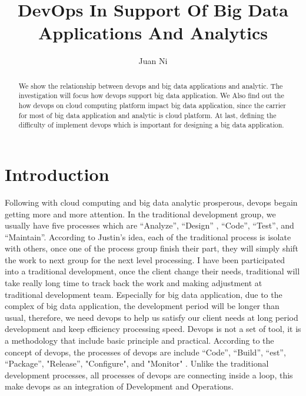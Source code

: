 \documentclass[sigconf]{acmart}
\begin{document}
\title{DevOps In Support Of Big Data Applications And Analytics}


\author{Juan Ni}




\begin{abstract}
We show the relationship between devops and big data applications and analytic. The investigation will focus how devops support big data application. We Also find out the how devops on cloud computing platform impact big data application, since the carrier for  most of big data application and analytic is cloud platform. At last, defining the difficulty of implement devops which is important for designing a big data application.
\end{abstract}



\maketitle

\section{Introduction}

Following with cloud computing and big data analytic prosperous, devops begain getting more and more attention. In the traditional development group, we usually have five processes which are ``Analyze'', ``Design'' , ``Code'', ``Test'', and ``Maintain''\cite{traditional:01}. According to Justin's idea, each of the traditional process is isolate with others, once one of the process group finish their part, they will simply shift the work to next group for the next level processing. I have been participated into a traditional development, once the client change their needs, traditional will take really long time to track back the work and making adjustment at traditional development team. Especially for big data application, due to the complex of big data application, the development period will be longer than usual, therefore, we need devops to help us satisfy our client needs at long period development and keep efficiency processing speed. Devops is not a set of tool, it is a methodology that include basic principle and practical. According to the concept of devops, the processes of devops are include ``Code'', ``Build'', ``est'', ``Package'', "Release'', "Configure", and "Monitor" \cite{wiki:01}. Unlike the traditional development processes, all processes of devops are connecting inside a loop, this make devops as an integration of Development and Operations.
 
\end{document}
